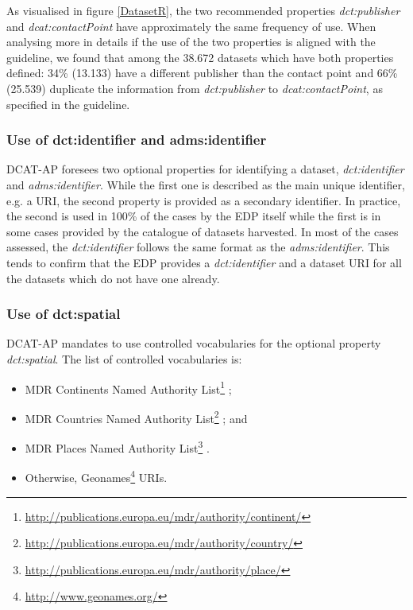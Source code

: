 \documentclass[<options>]{elsarticle}
\begin{document}
As visualised in figure \ref{DatasetR}, the two recommended properties \textit{dct:publisher} and \textit{dcat:contactPoint} have approximately the same frequency of use. When analysing more in details if the use of the two properties is aligned with the guideline, we found that among the 38.672 datasets which have both properties defined: 34\% (13.133) have a different publisher than the contact point and 66\% (25.539) duplicate the information from \textit{dct:publisher} to \textit{dcat:contactPoint}, as specified in the guideline.

\subsubsection{Use of dct:identifier and adms:identifier}
DCAT-AP foresees two optional properties for identifying a dataset, \textit{dct:identifier} and \textit{adms:identifier}. While the first one is described as the main unique identifier, e.g. a URI, the second property is provided as a secondary identifier. In practice, the second is used in 100\% of the cases by the EDP itself while the first is in some cases provided by the catalogue of datasets harvested. In most of the cases assessed, the \textit{dct:identifier} follows the same format as the \textit{adms:identifier}. This tends to confirm that the EDP provides a \textit{dct:identifier} and a dataset URI for all the datasets which do not have one already.

\subsubsection{Use of dct:spatial}
DCAT-AP mandates to use controlled vocabularies for the optional property \textit{dct:spatial}. The list of controlled vocabularies is:

\begin{itemize}
\item MDR Continents Named Authority List\footnote{\href{  http://publications.europa.eu/mdr/authority/continent/}{  http://publications.europa.eu/mdr/authority/continent/}} ;
\item MDR Countries Named Authority List\footnote{\href{  http://publications.europa.eu/mdr/authority/country/}{  http://publications.europa.eu/mdr/authority/country/}} ; and
\item MDR Places Named Authority List\footnote{\href{  http://publications.europa.eu/mdr/authority/place/}{  http://publications.europa.eu/mdr/authority/place/}} .
\item Otherwise, Geonames\footnote{\href{  http://www.geonames.org/}{  http://www.geonames.org/}} URIs.
\end{itemize}
\end{document}

